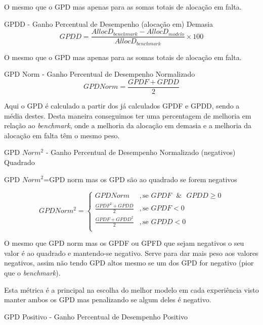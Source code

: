 O mesmo que o GPD mas apenas para as somas totais de alocação em falta.\par
\bigskip
GPDD - Ganho Percentual de Desempenho (alocação em) Demasia\\

\begin{equation} \label{eq:gpdd} 
    GPDD = \frac{AllocD_{benchmark} - AllocD_{modelo}}{AllocD_{benchmark}} \times 100
\end{equation}
\smallskip

O mesmo que o GPD mas apenas para as somas totais de alocação em falta.\par
\bigskip
GPD Norm - Ganho Percentual de Desempenho Normalizado \\

\begin{equation} \label{eq:gpdnorm} 
    GPD Norm = \frac{GPDF + GPDD}{2}
\end{equation}
\smallskip

Aqui o GPD é calculado a partir dos já calculados GPDF e GPDD, sendo a média destes. Desta maneira conseguimos ter uma percentagem de melhoria em relação ao \textit{benchmark}, onde a melhoria da alocação em demasia e a melhoria da alocação em falta têm o mesmo peso.\par

\bigskip
GPD $Norm^{2}$ - Ganho Percentual de Desempenho Normalizado (negativos) Quadrado

 GPD $Norm^{2}$=GPD norm mas os GPD são ao quadrado se forem negativos  


 \begin{equation} \label{eq:gpdnorm2} 
    GPD Norm^{2} = 
    \begin{cases} 
        GPD Norm & , \text{se } GPDF \text{ }\&\text{ } GPDD \geq 0 \\
        \frac{GPDF^{2} + GPDD}{2} & , \text{se } GPDF  < 0 \\
        \frac{GPDF + GPDD^{2}}{2} & , \text{se } GPDD < 0 \\
    \end{cases} 
\end{equation}
\smallskip


O mesmo que GPD norm mas os GPDF ou GPFD que sejam negativos o seu valor é ao quadrado e mantendo-se negativo. Serve para dar mais peso aos valores negativos, assim não tendo GPD altos mesmo se um dos GPD for negativo (pior que o \textit{benchmark}).\par
Esta métrica é a principal na escolha do melhor modelo em cada experiência visto manter ambos os GPD mas penalizando se algum deles é negativo.\par
\bigskip
GPD Positivo  - Ganho Percentual de Desempenho Positivo

